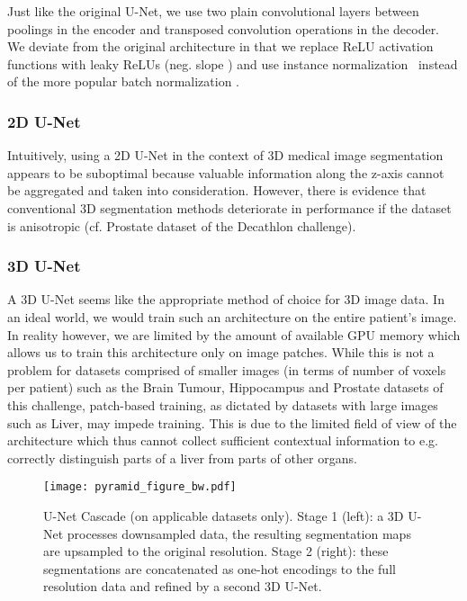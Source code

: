\documentclass{templates/llncs}
\begin{document}
    Just like the original U-Net, we use two plain convolutional layers between poolings in the encoder and transposed convolution operations in the decoder. We deviate from the original architecture in that we replace ReLU activation functions with leaky ReLUs (neg. slope ) and use instance normalization~\cite{ulyanov2016instance} instead of the more popular batch normalization \cite{ioffe2015batch}. 

    
    \subsubsection{2D U-Net}
    Intuitively, using a 2D U-Net in the context of 3D medical image segmentation appears to be suboptimal because valuable information along the z-axis cannot be aggregated and taken into consideration. However, there is evidence \cite{isensee2017automatic} that conventional 3D segmentation methods deteriorate in performance if the dataset is anisotropic  (cf. Prostate dataset of the Decathlon challenge).
    
    \subsubsection{3D U-Net}
    A 3D U-Net seems like the appropriate method of choice for 3D image data. In an ideal world, we would train such an architecture on the entire patient's image. In reality however, we are limited by the amount of available GPU memory which allows us to train this architecture only on image patches. While this is not a problem for datasets comprised of smaller images (in terms of number of voxels per patient) such as the Brain Tumour, Hippocampus and Prostate datasets of this challenge, patch-based training, as dictated by datasets with large images such as Liver, may impede training. This is due to the limited field of view of the architecture which thus cannot collect sufficient contextual information to e.g. correctly distinguish parts of a liver from parts of other organs.
    
    \begin{figure}
        \centering
        \texttt{[image: pyramid\_figure\_bw.pdf]}
        \caption{U-Net Cascade (on applicable datasets only). Stage 1 (left): a 3D U-Net processes downsampled data, the resulting segmentation maps are upsampled to the original resolution. Stage 2 (right): these segmentations are concatenated as one-hot encodings to the full resolution data and refined by a second 3D U-Net.}
        \label{fig:cascade}
    \end{figure}
\end{document}
